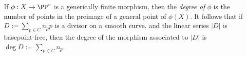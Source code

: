 If $\phi:X \to \PP^r$ is a generically finite morphism, then the \emph{degree of $\phi$} is the number of points in the preimage of a general point of $\phi(X)$. It follows that if $D := \sum_{p\in C} n_pp$ is a divisor on a smooth curve, and the linear series $|D|$ is basepoint-free, then the degree of the morphism associated to $|D|$ is $\deg D := \sum_{p\in C} n_p$.

%
%
%
%
%
%
%
